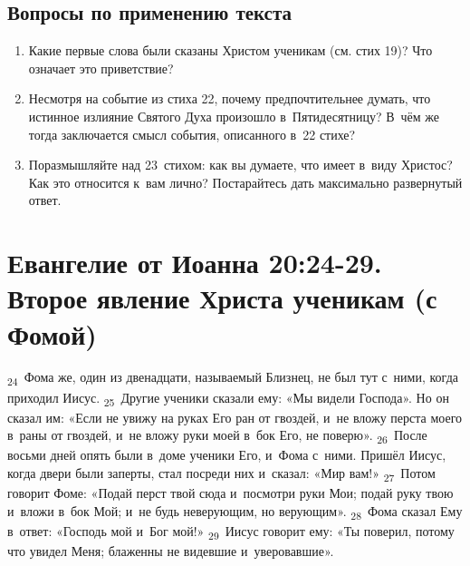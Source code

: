 \documentclass[a4paper,12pt]{article}
\begin{document}
\subsection*{Вопросы по применению текста} 
\begin{enumerate}
    \item Какие первые слова были сказаны Христом ученикам (см. стих 19)? Что означает это приветствие? 
    
    \myline
    
    \myline
    \item Несмотря на событие из стиха 22, почему предпочтительнее думать, что истинное излияние Святого Духа произошло в~Пятидесятницу? В~чём же тогда заключается смысл события, описанного в~22 стихе? 
    
    \myline
    
    \myline
    \item Поразмышляйте над 23~стихом: как вы думаете, что имеет в~виду Христос? Как это относится к~вам лично? Постарайтесь дать максимально развернутый ответ. 
    
    \myline
    
    \myline
\end{enumerate}



\section{Евангелие от Иоанна 20:24-29. Второе явление Христа ученикам (с Фомой)} 

 \textsubscript{24}~Фома же, один из двенадцати, называемый Близнец, не был тут с~ними, когда приходил Иисус. \textsubscript{25}~Другие ученики сказали ему: «Мы видели Господа». Но он сказал им: «Если не увижу на руках Его ран от гвоздей, и~не вложу перста моего в~раны от гвоздей, и~не вложу руки моей в~бок Его, не поверю». \textsubscript{26}~После восьми дней опять были в~доме ученики Его, и~Фома с~ними. Пришёл Иисус, когда двери были заперты, стал посреди них и~сказал: «Мир вам!» \textsubscript{27}~Потом говорит Фоме: «Подай перст твой сюда и~посмотри руки Мои; подай руку твою и~вложи в~бок Мой; и~не будь неверующим, но верующим». \textsubscript{28}~Фома сказал Ему в~ответ: «Господь мой и~Бог мой!» \textsubscript{29}~Иисус говорит ему: «Ты поверил, потому что увидел Меня; блаженны не видевшие и~уверовавшие».
\end{document}
